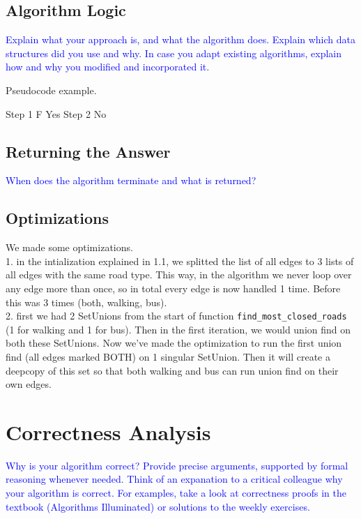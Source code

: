 \documentclass[a4paper]{article}
\newcommand{\instruction}[1]{\textcolor{blue}{#1}}
\begin{document}
\subsection{Algorithm Logic}
\instruction{Explain what your approach is, and what the algorithm does. Explain which data structures did you use and why. In case you adapt existing algorithms, explain how and why you modified and incorporated it.}

\begin{algorithm}[h!]
    \caption{Pseudocode example.}
    \label{pseudocode}
    \begin{algorithmic}[1]
    \State Step 1
     F
    \State \Return Yes
    \Else 
    \State Step 2
    \EndIf
    \EndWhile 
    \State \Return No
    \EndFunction
    \end{algorithmic}
    \end{algorithm}

\subsection{Returning the Answer}
\instruction{When does the algorithm terminate and what is returned?}

\subsection{Optimizations}
We made some optimizations.\\1. in the intialization explained in 1.1, we splitted the list of all edges to 3 lists of all edges with the same road type. This way, in the algorithm we never loop over any edge more than once, so in total every edge is now handled 1 time. Before this was 3 times (both, walking, bus).
\\2. first we had 2 SetUnions from the start of function \texttt{find\_most\_closed\_roads} (1 for walking and 1 for bus). Then in the first iteration, we would union find on both these SetUnions. Now we've made the optimization to run the first union find (all edges marked BOTH) on 1 singular SetUnion. Then it will create a deepcopy of this set so that both walking and bus can run union find on their own edges.

\section{Correctness Analysis}
\instruction{Why is your algorithm correct? Provide precise arguments, supported by formal reasoning whenever needed. Think of an expanation to a critical colleague why your algorithm is correct. For examples, take a look at correctness proofs in the textbook (Algorithms Illuminated) or solutions to the weekly exercises.}
\end{document}
